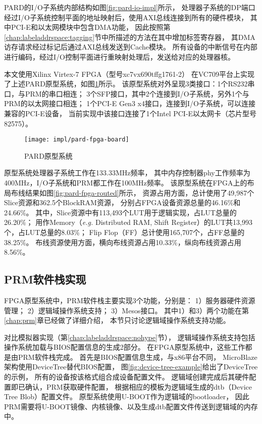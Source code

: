 PARD的I/O子系统内部结构如图\ref{fig:pard-io-impl}所示，
处理器子系统的DP端口经过I/O子系统控制平面的地址映射后，使用AXI总线连接到所有的硬件模块，
其中PCI-E和以太网模块中包含DMA功能，
因此按照第\ref{chap:labeladdrspace:tagging}节中所描述的方法在其中增加标签寄存器，
其DMA访存请求经过标记后通过AXI总线发送到Cache模块。
所有设备的中断信号在内部进行编码，经过I/O控制平面进行重映射处理后，发送给对应的处理器核。

本文使用Xilinx Virtex-7 FPGA（型号xc7vx690tffg1761-2）
在VC709平台上实现了上述PARD原型系统，如图\ref{fig:pard-fpga-board}所示。
该原型系统对外呈现3类接口：1个RS232串口，与PRM的串口相连；
3个SFP接口，其中2个连接到I/O子系统，另外1个与PRM的以太网接口相连；
1个PCI-E Gen3 x4接口，连接到I/O子系统，可以连接兼容的PCI-E设备，
当前实现中该接口连接了1个Intel PCI-E以太网卡（芯片型号82575）。

\begin{figure}[t]
  \centering
  \texttt{[image: impl/pard-fpga-board]}
  \caption{PARD原型系统}
  \label{fig:pard-fpga-board}
\end{figure}

原型系统处理器子系统工作在133.33MHz频率，
其中内存控制器phy工作频率为400MHz，I/O子系统和PRM都工作在100MHz频率。
该原型系统在FPGA上的布局布线结果如图\ref{fig:pard-fpga-routed}所示，
资源占用方面，总计使用了49,987个Slice资源和362.5个BlockRAM资源，
分别占FPGA设备资源总量的46.16\%和24.66\%。
其中，Slice资源中有113,493个LUT用于逻辑实现，占LUT总量的26.20\%；
用作Memory（\emph{e.g.} Distributed RAM, Shift Register）的LUT共13,993个，占LUT总量的8.03\%；
Flip Flop（FF）总计使用165,707个，占FF总量的38.25\%。
布线资源使用方面，横向布线资源占用10.33\%，纵向布线资源占用8.56\%。


\subsection{PRM软件栈实现}

FPGA原型系统中，PRM软件栈主要实现3个功能，分别是：
1）服务器硬件资源管理；
2）逻辑域操作系统支持；
3）Mesos接口。
其中1）和3）两个功能在第\ref{chap:prm}章已经做了详细介绍，
本节只讨论逻辑域操作系统支持功能。

对比模拟器实现（第\ref{chap:labeladdrspace:nohype}节），
逻辑域操作系统支持包括操作系统加载与BIOS配置信息的生成2部分。
在FPGA原型系统中，这些工作都是由PRM软件栈完成。
首先是BIOS配置信息生成，与x86平台不同，
MicroBlaze架构使用DeviceTree\cite{device-tree}替代BIOS配置，
图\ref{fig:device-tree-example}给出了DeviceTree的示例，
所有的设备按该格式组合成设备配置文件。
逻辑域创建完成后其硬件配置即已确认，PRM获取硬件配置，
根据相应的模板为逻辑域生成的dtb（Device Tree Blob）配置文件。
原型系统使用U-BOOT\cite{u-boot}作为逻辑域的bootloader，
因此PRM需要将U-BOOT镜像、内核镜像、以及生成dtb配置文件传送到逻辑域的内存中。

